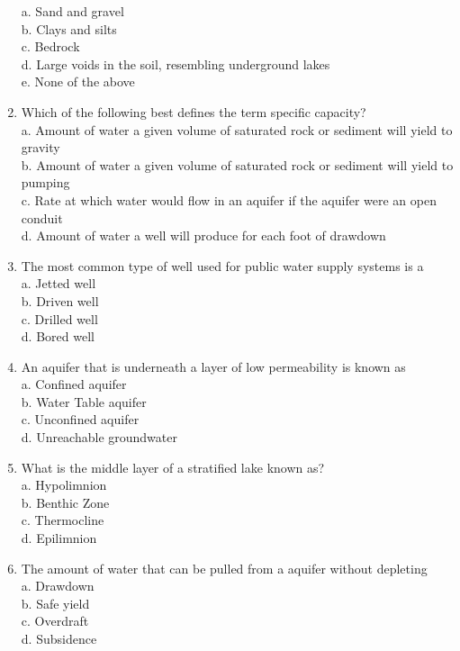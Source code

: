 \begin{enumerate}[1.]
a. Sand and gravel\\
b. Clays and silts\\
c. Bedrock\\
d. Large voids in the soil, resembling underground lakes\\
e. None of the above\\
\item Which of the following best defines the term specific capacity?\\
a. Amount of water a given volume of saturated rock or sediment will yield to gravity\\
b. Amount of water a given volume of saturated rock or sediment will yield to pumping\\
c. Rate at which water would flow in an aquifer if the aquifer were an open conduit\\
d. Amount of water a well will produce for each foot of drawdown\\
\item The most common type of well used for public water supply systems is a\\
a. Jetted well\\
b. Driven well\\
c. Drilled well\\
d. Bored well 
\item An aquifer that is underneath a layer of low permeability is known as\\
a. Confined aquifer\\
b. Water Table aquifer\\
c. Unconfined aquifer\\
d. Unreachable groundwater\\
\item What is the middle layer of a stratified lake known as?\\
a. Hypolimnion\\
b. Benthic Zone\\
c. Thermocline\\
d. Epilimnion\\
\item The amount of water that can be pulled from a aquifer without depleting\\
a. Drawdown\\
b. Safe yield\\
c. Overdraft\\
d. Subsidence\\
\end{enumerate}


